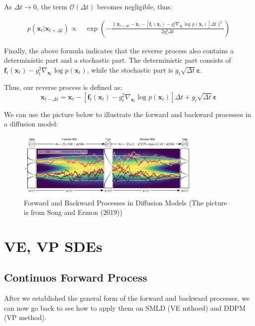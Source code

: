 As \( \Delta t \to 0 \), the term \( \mathcal{O}(\Delta t) \) becomes negligible, thus:

\begin{equation}
\begin{aligned}
p(\mathbf{x}_t|\mathbf{x}_{t+\Delta t}) \propto&\, \exp\left(-\frac{\|\mathbf{x}_{t+\Delta t} - \mathbf{x}_t - \left[\mathbf{f}_t(\mathbf{x}_t) - g_t^2 \nabla_{\mathbf{x}_t} \log p(\mathbf{x}_t) \right] \Delta t\|^2}{2 g_t^2 \Delta t}\right)
\end{aligned}
\end{equation}

Finally, the above formula indicates that the reverse process also contains a deterministic part and a stochastic part. The deterministic part consists of \( \mathbf{f}_t(\mathbf{x}_t) - g_t^2 \nabla_{\mathbf{x}_t} \log p(\mathbf{x}_t) \), while the stochastic part is \( g_t \sqrt{\Delta t} \mathbf{\varepsilon} \).

Thus, our reverse process is defined as:
\begin{equation}
\mathbf{x}_{t-\Delta t} = \mathbf{x}_t - \left[\mathbf{f}_t(\mathbf{x}_t) - g_t^2 \nabla_{\mathbf{x}_t} \log p(\mathbf{x}_t) \right] \Delta t + g_t \sqrt{\Delta t} \mathbf{\varepsilon} \label{eq:reverse}
\end{equation}

We can use the picture below to illustrate the forward and backward processes in a diffusion model:

\begin{figure}[ht]
    \centering
    \includegraphics[width=0.8\textwidth]{Figures/diffusion.png}
    \caption{Forward and Backward Processes in Diffusion Models (The picture is from Song and Ermon (2019))}
    \label{fig:forward-backward}
\end{figure}

\section{VE, VP SDEs}

\subsection{Continuos Forward Process}
After we established the general form of the forward and backward processes, we can now go back to see how to apply them on SMLD (VE mthoed) and DDPM (VP method).

